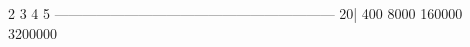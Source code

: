 \nextt
\begin{console}[fontsize=\footnotesize,commandchars=\\\{\}]
                    2              3              4              5
      ------------------------------------------------------------
   20|            400           8000         160000        3200000
\end{console}
